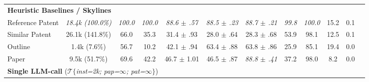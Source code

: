 \begin{table}[t]
{\begin{tabular}{lccccccccccc}
        \multicolumn{8}{l}{\textbf{Heuristic Baselines / Skylines}}\vspace{.4em}                                                                                                      \\
        Reference Patent
                              & \textit{18.4k (100.0\%)}
                              & \textit{100.0}
                              & \textit{100.0}
                              & \textit{88.6 $\pm$ .57}
                              & \textit{88.5 $\pm$ .23}
                              & \textit{88.7 $\pm$ .21}
                              & \textit{99.8}
                              & \textit{100.0}
                              & 15.2
                              & 0.1
        \\
        Similar Patent
                              & 26.1k (141.8\%)
                              & 66.0
                              & 35.3
                              & 31.4 $\pm$ .93
                              & 28.0 $\pm$ .64
                              & 28.3 $\pm$ .68
                              & 53.9
                              & 98.1
                              & 12.5
                              & 0.1
        \\
        Outline
                              & 1.4k (7.6\%)
                              & 56.7
                              & 10.2
                              & 42.1 $\pm$ .94
                              & 63.4 $\pm$ .88
                              & 63.8 $\pm$ .86
                              & 25.9
                              & 85.1
                              & 19.4
                              & 0.0
        \\
        Paper
                              & 9.5k (51.7\%)
                              & 69.6
                              & 42.2
                              & 46.7 $\pm$ 1.01
                              & 46.5 $\pm$ .87
                              & \textit{88.8 $\pm$ .41}
                              & 37.2
                              & 98.0
                              & 8.2
                              & 0.0
        \\
        \cmidrule{1-11}
        \multicolumn{8}{l}{\textbf{Single LLM-call} ($\mathcal{T}$\textit{$\{$inst=2k; pap=$\infty$; pat=$\infty\}$})}\vspace{.4em}                                                                                                          \\

\end{tabular}}
\end{table}
